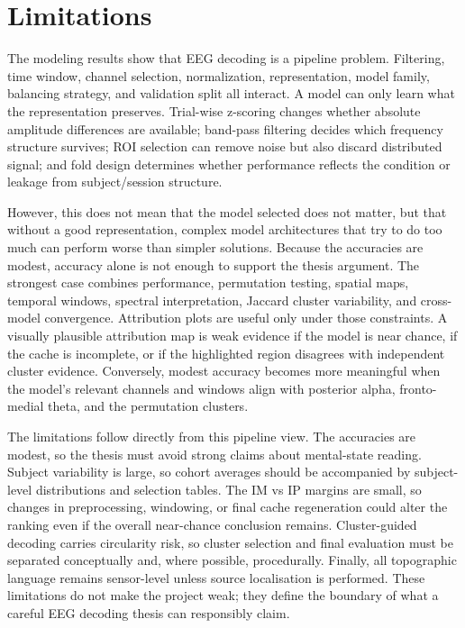 \documentclass[11pt,a4paper,chapterprefix=false,parskip=false]{scrreprt}
\begin{document}
\section{Limitations}
The modeling results show that EEG decoding is a pipeline problem. Filtering, time window, channel selection, normalization, representation, model family, balancing strategy, and validation split all interact. A model can only learn what the representation preserves. Trial-wise z-scoring changes whether absolute amplitude differences are available; band-pass filtering decides which frequency structure survives; ROI selection can remove noise but also discard distributed signal; and fold design determines whether performance reflects the condition or leakage from subject/session structure.

However, this does not mean that the model selected does not matter, but that without a good representation, complex model architectures that try to do too much can perform worse than simpler solutions. Because the accuracies are modest, accuracy alone is not enough to support the thesis argument. The strongest case combines performance, permutation testing, spatial maps, temporal windows, spectral interpretation, Jaccard cluster variability, and cross-model convergence. Attribution plots are useful only under those constraints. A visually plausible attribution map is weak evidence if the model is near chance, if the cache is incomplete, or if the highlighted region disagrees with independent cluster evidence. Conversely, modest accuracy becomes more meaningful when the model's relevant channels and windows align with posterior alpha, fronto-medial theta, and the permutation clusters.

The limitations follow directly from this pipeline view. The accuracies are modest, so the thesis must avoid strong claims about mental-state reading. Subject variability is large, so cohort averages should be accompanied by subject-level distributions and selection tables. The IM vs IP margins are small, so changes in preprocessing, windowing, or final cache regeneration could alter the ranking even if the overall near-chance conclusion remains. Cluster-guided decoding carries circularity risk, so cluster selection and final evaluation must be separated conceptually and, where possible, procedurally. Finally, all topographic language remains sensor-level unless source localisation is performed. These limitations do not make the project weak; they define the boundary of what a careful EEG decoding thesis can responsibly claim.
\end{document}
